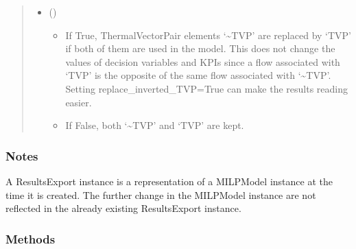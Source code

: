 \documentclass[letterpaper,10pt,english]{sphinxmanual}
\begin{document}
\begin{fulllineitems}
\begin{fulllineitems}
\begin{quote}
\begin{description}
\begin{itemize}
\item {} 
\sphinxAtStartPar
{} (\sphinxstyleliteralemphasis{\sphinxupquote{, }}\sphinxstyleliteralemphasis{\sphinxupquote{, }}) \textendash{} \begin{itemize}
\item {} 
\sphinxAtStartPar
If True, ThermalVectorPair elements ‘\textasciitilde{}TVP’ are replaced by ‘TVP’ if both of them are used in the model.
This does not change the values of decision variables and KPIs since
a flow associated with ‘TVP’ is the opposite of the same flow associated with ‘\textasciitilde{}TVP’.
Setting {\color{red}\bfseries{}\textasciigrave{}}replace\_inverted\_TVP\textasciigrave{}=True can make the results reading easier.

\item {} 
\sphinxAtStartPar
If False, both ‘\textasciitilde{}TVP’ and ‘TVP’ are kept.

\end{itemize}


\end{itemize}

\end{description}\end{quote}
\subsubsection*{Notes}

\sphinxAtStartPar
A ResultsExport instance is a representation of a MILPModel instance at the time it is created.
The further change in the MILPModel instance are not reflected in the already existing ResultsExport instance.

\end{fulllineitems}

\subsubsection*{Methods}


\begin{savenotes}\sphinxattablestart
\centering
\begin{tabulary}{\linewidth}[t]{}
\hline


\end{tabulary}
\end{savenotes}
\end{fulllineitems}
\end{document}
